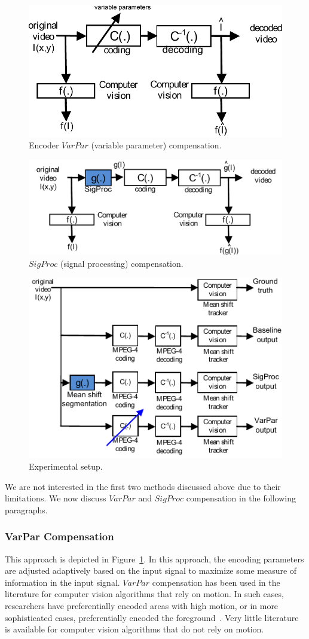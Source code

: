 \documentclass{article}
\begin{document}

			\begin{figure}
						\centering
						\includegraphics[width=.45\textwidth]{figs/TRK_IPCV2009_BlockDiagram_2_VarPar}
						\caption{Encoder $VarPar$ (variable parameter) compensation.}
						\label{fig:SolutionThroughVarPar}
			\end{figure}

			\begin{figure}
						\centering
						\includegraphics[width=.45\textwidth]{figs/TRK_IPCV2009_BlockDiagram_2_sigProc}
						\caption{$SigProc$ (signal processing) compensation.}
						\label{fig:SolutionThroughSigProc}
			\end{figure}

			\begin{figure}
					\includegraphics[width=.45\textwidth]{figs/TRK_IPCV2009_ExperimentalSetup_sigProc_VarPar}
					\caption{Experimental setup.}
					\label{fig:ExperimentalSetup}
			\end{figure}

We are not interested in the first two methods discussed above due to their limitations.  We now discuss $VarPar$ and $SigProc$ compensation in the following paragraphs.

\subsubsection{VarPar Compensation}
This approach is depicted in Figure~\ref{fig:SolutionThroughVarPar}.  In this approach, the encoding parameters are adjusted adaptively based on the input signal to maximize some measure of information in the input signal.  $VarPar$ compensation has been used in the literature for computer vision algorithms that rely on motion.  In such cases, researchers have preferentially encoded areas with high motion, or in more sophisticated cases, preferentially encoded the foreground~\cite{2005_CNF_SceneAnalysisForJPEG2000_Meessen}.  Very little literature is available for computer vision algorithms that do not rely on motion. 
\end{document}
